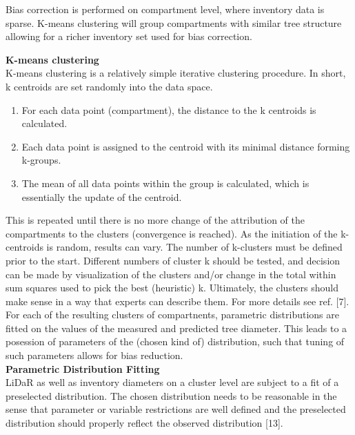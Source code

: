 Bias correction is performed on compartment level, where inventory data is sparse. K-means clustering will group
compartments with similar tree structure allowing for a richer inventory set used for bias correction.

\textbf{K-means clustering} \\
K-means clustering is a relatively simple iterative clustering procedure. In short, k centroids are set randomly into the data space.


\begin{enumerate}
\renewcommand{\labelenumi}{\arabic{enumi}}
\item For each data point (compartment), the distance to the k centroids is calculated.
\item Each data point is assigned to the centroid with its minimal distance forming k-groups.
\item The mean of all data points within the group is calculated, which is essentially the update of the centroid.

\end{enumerate}


This is repeated until there is no more change of the attribution of the compartments to the clusters (convergence is
reached). As the initiation of the k-centroids is random, results can vary. The number of k-clusters must be
defined prior to the start. Different numbers of cluster k should be tested, and decision can be made by
visualization of the clusters and/or change in the total within sum squares used to pick the best (heuristic) k.
Ultimately, the clusters should make sense in a way that experts can describe them. For more details see ref. [7].\\


For each of the resulting clusters of compartnents, parametric distributions are fitted on the values of the measured and predicted tree diameter. This leads to a posession of parameters of the (chosen kind of) distribution, such that tuning of such parameters allows for bias reduction.\\

\textbf{Parametric Distribution Fitting} \\
LiDaR as well as inventory diameters on a cluster level are subject to a fit of a preselected distribution. The chosen distribution needs to be reasonable in the sense that parameter or variable restrictions are well defined and the preselected distribution should properly reflect the observed distribution [13].\\

